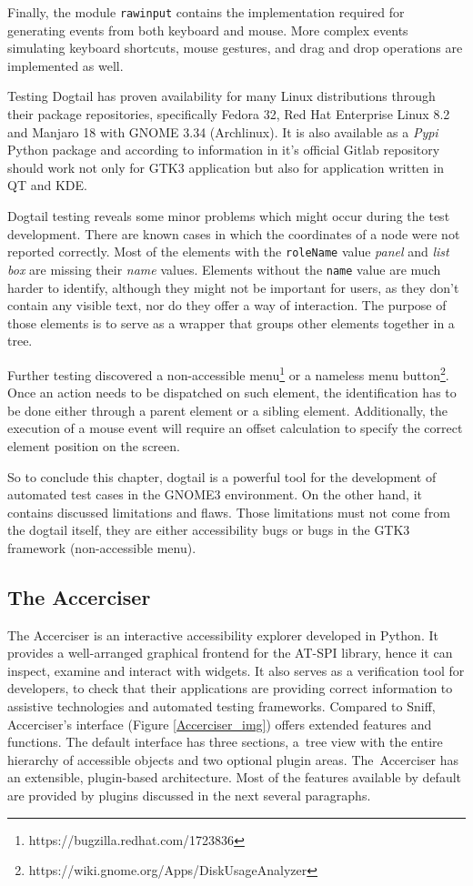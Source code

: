 Finally, the module \texttt{rawinput} contains the implementation required for generating events from both keyboard and mouse. More complex events simulating keyboard shortcuts, mouse gestures, and drag and drop operations are implemented as well.

Testing Dogtail has proven availability for many Linux distributions through their package repositories, specifically Fedora 32, Red Hat Enterprise Linux 8.2 and Manjaro 18 with GNOME 3.34 (Archlinux). It is also available as a \textit{Pypi} Python package and according to information in it's official Gitlab repository should work not only for GTK3 application but also for application written in QT and KDE. 
 
Dogtail testing reveals some minor problems which might occur during the test development. There are known cases in which the coordinates of a node were not reported correctly. Most of the elements with the \texttt{roleName} value \textit{panel} and \textit{list box} are missing their \textit{name} values. Elements without the \texttt{name} value are much harder to identify, although they might not be important for users, as they don't contain any visible text, nor do they offer a way of interaction. The purpose of those elements is to serve as a wrapper that groups other elements together in a tree. 

Further testing discovered a non-accessible menu\footnote{https://bugzilla.redhat.com/1723836} or a nameless menu button\footnote{https://wiki.gnome.org/Apps/DiskUsageAnalyzer}. Once an action needs to be dispatched on such element, the identification has to be done either through a parent element or a sibling element. Additionally, the execution of a mouse event will require an offset calculation to specify the correct element position on the screen.
 
 So to conclude this chapter, dogtail is a powerful tool for the development of automated test cases in the GNOME3 environment. On the other hand, it contains discussed limitations and flaws. Those limitations must not come from the dogtail itself, they are either accessibility bugs or bugs in the GTK3 framework (non-accessible menu).  

\subsection{The Accerciser}
The Accerciser is an interactive accessibility explorer developed in Python. It provides a well-arranged graphical frontend for the AT-SPI library, hence it can inspect, examine and interact with widgets. It also serves as a verification tool for developers, to check that their applications are providing correct information to assistive technologies and automated testing frameworks. Compared to Sniff, Accerciser's interface (Figure \ref{Accerciser_img}) offers extended features and functions. The default interface has three sections, a~tree view with the entire hierarchy of accessible objects and two optional plugin areas. The~Accerciser has an extensible, plugin-based architecture. Most of the features available by default are provided by plugins discussed in the next several paragraphs.

